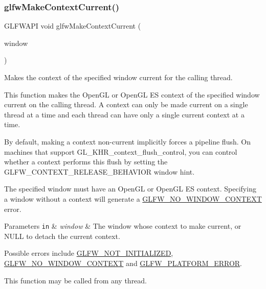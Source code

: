 \subsubsection{\texorpdfstring{glfw\+Make\+Context\+Current()}{glfwMakeContextCurrent()}}
{\footnotesize\ttfamily G\+L\+F\+W\+A\+PI void glfw\+Make\+Context\+Current (\begin{DoxyParamCaption}\item[{\hyperlink{group__window_ga3c96d80d363e67d13a41b5d1821f3242}{G\+L\+F\+Wwindow} $\ast$}]{window }\end{DoxyParamCaption})}



Makes the context of the specified window current for the calling thread. 

This function makes the Open\+GL or Open\+GL ES context of the specified window current on the calling thread. A context can only be made current on a single thread at a time and each thread can have only a single current context at a time.

By default, making a context non-\/current implicitly forces a pipeline flush. On machines that support {\ttfamily G\+L\+\_\+\+K\+H\+R\+\_\+context\+\_\+flush\+\_\+control}, you can control whether a context performs this flush by setting the G\+L\+F\+W\+\_\+\+C\+O\+N\+T\+E\+X\+T\+\_\+\+R\+E\+L\+E\+A\+S\+E\+\_\+\+B\+E\+H\+A\+V\+I\+OR window hint.

The specified window must have an Open\+GL or Open\+GL ES context. Specifying a window without a context will generate a \hyperlink{group__errors_gacff24d2757da752ae4c80bf452356487}{G\+L\+F\+W\+\_\+\+N\+O\+\_\+\+W\+I\+N\+D\+O\+W\+\_\+\+C\+O\+N\+T\+E\+XT} error.


\begin{DoxyParams}[1]{Parameters}
\mbox{\tt in}  & {\em window} & The window whose context to make current, or {\ttfamily N\+U\+LL} to detach the current context.\\
\hline
\end{DoxyParams}
Possible errors include \hyperlink{group__errors_ga2374ee02c177f12e1fa76ff3ed15e14a}{G\+L\+F\+W\+\_\+\+N\+O\+T\+\_\+\+I\+N\+I\+T\+I\+A\+L\+I\+Z\+ED}, \hyperlink{group__errors_gacff24d2757da752ae4c80bf452356487}{G\+L\+F\+W\+\_\+\+N\+O\+\_\+\+W\+I\+N\+D\+O\+W\+\_\+\+C\+O\+N\+T\+E\+XT} and \hyperlink{group__errors_gad44162d78100ea5e87cdd38426b8c7a1}{G\+L\+F\+W\+\_\+\+P\+L\+A\+T\+F\+O\+R\+M\+\_\+\+E\+R\+R\+OR}.

This function may be called from any thread.

